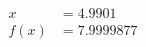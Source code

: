 \documentclass[preview]{standalone}
\begin{document}
\begin{align*}
x &= 4.9901\\f(x) &= 7.9999877
\end{align*}
\end{document}
